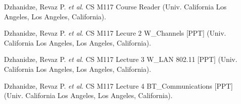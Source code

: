 \documentclass[twoside,twocolumn]{article}
\begin{document}
\begin{thebibliography}{99} %

Dzhanidze, Revaz P. \textit{et al}. CS M117 Course Reader
(Univ. California Los Angeles, Los Angeles, California).

Dzhanidze, Revaz P. \textit{et al}. CS M117 Lecure 2 W\_Channels [PPT]
(Univ. California Los Angeles, Los Angeles, California).

Dzhanidze, Revaz P. \textit{et al}. CS M117 Lecture 3 W\_LAN 802.11 [PPT]
(Univ. California Los Angeles, Los Angeles, California).

Dzhanidze, Revaz P. \textit{et al}. CS M117 Lecture 4 BT\_Communications [PPT]
(Univ. California Los Angeles, Los Angeles, California).

\end{thebibliography}

\end{document}
